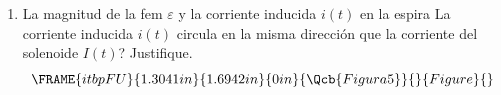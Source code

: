 \documentclass[onecolumn]{article}
\begin{document}
\begin{enumerate}
\begin{enumerate}
\item La magnitud de la fem $\varepsilon $ y la corriente inducida $i(t)$ en
la espira \textquestiondown La corriente inducida $i(t)$ circula en la misma
direcci\'{o}n que la corriente del solenoide $I(t)$? Justifique.%
\begin{equation*}
\FRAME{itbpFU}{1.3041in}{1.6942in}{0in}{\Qcb{Figura 5}}{}{Figure}{\special%
{language "Scientific Word";type "GRAPHIC";maintain-aspect-ratio
TRUE;display "USEDEF";valid_file "T";width 1.3041in;height 1.6942in;depth
0in;original-width 2.2295in;original-height 2.9066in;cropleft "0";croptop
"1";cropright "1";cropbottom "0";tempfilename
'THI7EE01.wmf';tempfile-properties "XPR";}}
\end{equation*}
\end{enumerate}
\end{enumerate}
\end{document}

